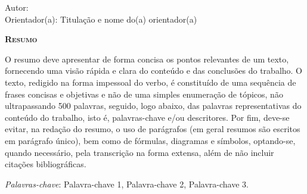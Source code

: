 \begin{center}
	{\Large{\textbf{\thesistitle}}}
\end{center}

\vspace{1cm}

\begin{flushright}
	Autor: \thesisauthor\\
	Orientador(a): Titulação e nome do(a) orientador(a)
\end{flushright}

\vspace{1cm}

\begin{center}
	\Large{\textsc{\textbf{Resumo}}}
\end{center}

\noindent O resumo deve apresentar de forma concisa os pontos relevantes de um
texto, fornecendo uma visão rápida e clara do conteúdo e das conclusões do
trabalho. O texto, redigido na forma impessoal do verbo, é constituído de uma
sequência de frases concisas e objetivas e não de uma simples enumeração de
tópicos, não ultrapassando 500 palavras, seguido, logo abaixo, das palavras
representativas do conteúdo do trabalho, isto é, palavras-chave e/ou
descritores. Por fim, deve-se evitar, na redação do resumo, o uso de parágrafos
(em geral resumos são escritos em parágrafo único), bem como de fórmulas,
diagramas e símbolos, optando-se, quando necessário, pela transcrição na forma
extensa, além de não incluir citações bibliográficas.

\noindent\textit{Palavras-chave}: Palavra-chave 1, Palavra-chave 2, Palavra-chave 3.